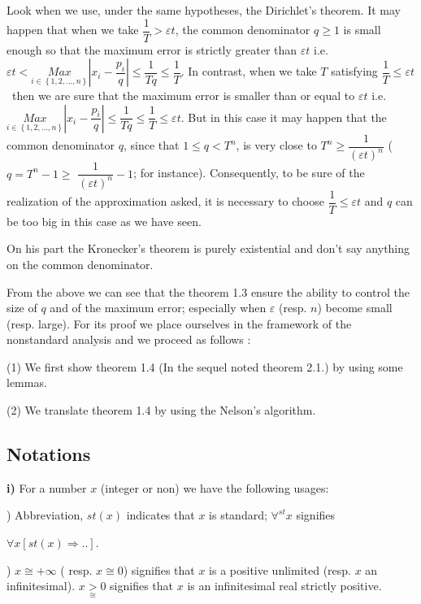 \documentclass[12pt]{article}
\begin{document}
Look when we use, under the same hypotheses, the Dirichlet's theorem. It may
happen that when we take $\dfrac{1}{T}>\varepsilon t$, the common
denominator $q\geq 1$ is small enough so that the maximum error is strictly
greater than $\varepsilon t$ i.e. $\varepsilon t<\underset{i\in \left\{
1,2,...,n\right\} }{Max}\left\vert x_{i}-\dfrac{p_{i}}{q}\right\vert \leq 
\dfrac{1}{Tq}\leq \dfrac{1}{T}$. In contrast, when we take $T$ satisfying $%
\dfrac{1}{T}\leq \varepsilon t$ \ then we are sure that the maximum error is
smaller than or equal to $\varepsilon t$ i.e. $\underset{i\in \left\{
1,2,...,n\right\} }{Max}\left\vert x_{i}-\dfrac{p_{i}}{q}\right\vert \leq 
\dfrac{1}{Tq}\leq \dfrac{1}{T}\leq \varepsilon t$. But in this case it may
happen that the common denominator $q$, since that $1\leq q<T^{n}$, is very
close to $T^{n}\geq \dfrac{1}{\left( \varepsilon t\right) ^{n}}$ ( $%
q=T^{n}-1\geq $ $\dfrac{1}{\left( \varepsilon t\right) ^{n}}-1$; for
instance). Consequently, to be sure of the realization of the approximation
asked, it is necessary to choose $\dfrac{1}{T}\leq \varepsilon t$ and $q$
can be too big in this case as we have seen.

On his part the Kronecker's theorem is purely existential and don't say
anything on the common denominator.

From the above we can see that the theorem 1.3 ensure the ability to control
the size of $q$ and of the maximum error; especially when $\varepsilon $
(resp. $n$) become small (resp. large). For its proof we place ourselves in
the framework of the nonstandard analysis and we proceed as follows :\newline

\noindent (1) We first show theorem 1.4 (In the sequel noted theorem 2.1.)
by using some lemmas.

\noindent (2) We translate theorem 1.4 by using the Nelson's algorithm.

\subsection{Notations}

\noindent \textbf{i) }For a number $x$ (integer or non) we have the
following usages:

) Abbreviation, $st(x)$ indicates that $x$ is standard; $\forall
^{st}x$ signifies

\noindent $\forall x\left[ st(x)\Longrightarrow ..\right] $.

) $x\cong +\infty $ ( resp. $x\cong 0$) signifies that $x$ is a
positive unlimited (resp. $x$ an infinitesimal). $x\underset{\cong }{>}0$
signifies that $x$ is an infinitesimal real strictly positive.
\end{document}

